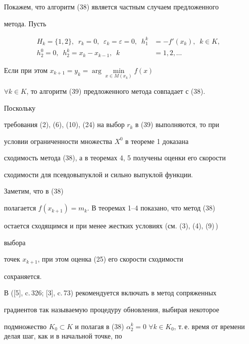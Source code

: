 Покажем, что алгоритм (38) является частным случаем предложенного 


метода. Пусть 


\begin{equation}


\begin{split}


H_k=\{1,2\},\ \; r_k=0,\ \;\varepsilon_k=\varepsilon =0,


\ \; h^k_1&=-{f}'(x_k),\ \; k\in K, \\


h^0_2=0,\ \;h^k_2=x_k-x_{k-1},\ \; k&=1,2,\dotsc


\end{split}


\end{equation}


Если при этом $x_{k+1}=y_k=\arg\min\limits_{x\in M(x_k)}f(x)$


$\forall k\in K$, то алгоритм (39) предложенного метода совпадает с (38). 


Поскольку 


требования (2), (6), (10), (24) на выбор $r_k$ в (39) выполняются, то при 


условии ограниченности множества $X^0$ в теореме 1 доказана 


сходимость метода (38), а в теоремах 4, 5 получены оценки его скорости 


сходимости для псевдовыпуклой и сильно выпуклой функции.


Заметим, что в (38) 


полагается $f(x_{k+1})=m_k$. В теоремах 1--4 показано, что метод (38) 


остается сходящимся и при менее жестких условиях (см. (3), (4), (9)\,) 


выбора 


точек $x_{k+1}$, при этом оценка (25) его скорости сходимости 


сохраняется. 





В ([5], c.\,326; [3], c.\,73) рекомендуется включать в метод сопряженных 


градиентов так называемую процедуру обновления, выбирая некоторое 


подмножество $K_0\subset K$ и полагая в (38) $\alpha^k_2=0$ $\forall 


k\in K_0$, т.\,е.{} время от времени делая шаг, как и в начальной точке, по 


